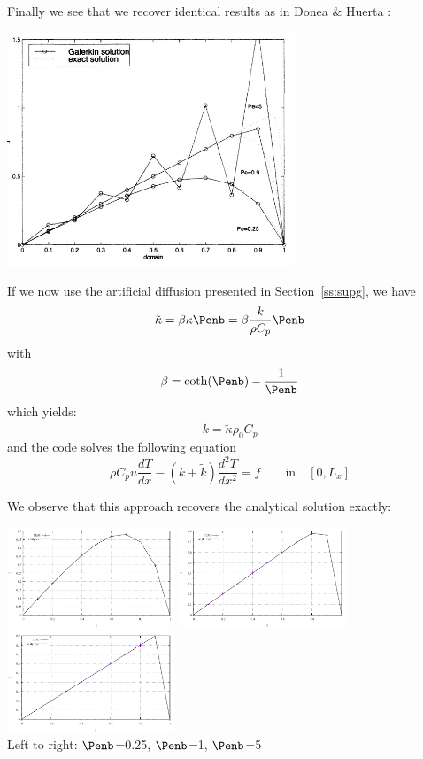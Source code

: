 Finally we see that we recover identical results as in Donea \& Huerta \cite{dohu03}:

\begin{center}
\includegraphics[width=8.6cm]{python_codes/fieldstone_65/images/dohu}
\end{center}

If we now use the artificial diffusion presented in Section~\ref{ss:supg}, we have
\[
\tilde{\kappa}=\beta \kappa \Penb = \beta \frac{k}{\rho C_p} \Penb
\]
with 
\[
\beta=\coth(\Penb)-\frac{1}{\Penb}
\]
which yields:
\[
\tilde{k} = \tilde{\kappa} \rho_0 C_p 
\]
and the code solves the following equation
\begin{equation}
\rho C_p u \frac{dT}{dx} - (k + \tilde{k})\frac{d^2T}{dx^2} = f \qquad \text{in} \quad [0,L_x]
\end{equation}


We observe that this approach recovers the analytical solution exactly:
\begin{center}
\includegraphics[width=5cm]{python_codes/fieldstone_65/results/exp1/artdiff/T1.pdf}
\includegraphics[width=5cm]{python_codes/fieldstone_65/results/exp1/artdiff/T2.pdf}
\includegraphics[width=5cm]{python_codes/fieldstone_65/results/exp1/artdiff/T3.pdf}\\
{\captionfont Left to right: $\Penb$=0.25, $\Penb$=1, $\Penb$=5}
\end{center}

